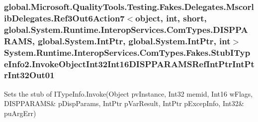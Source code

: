 \hypertarget{class_system_1_1_runtime_1_1_interop_services_1_1_com_types_1_1_fakes_1_1_stub_i_type_info2_af267cd272a63d5c0b874b6534d1c0d00}{
\subsubsection[{Invoke\-Object\-Int32\-Int16\-D\-I\-S\-P\-P\-A\-R\-A\-M\-S\-Ref\-Int\-Ptr\-Int\-Ptr\-Int32\-Out01}]{\setlength{\rightskip}{0pt plus 5cm}global.\-Microsoft.\-Quality\-Tools.\-Testing.\-Fakes.\-Delegates.\-Mscorlib\-Delegates.\-Ref3\-Out6\-Action7$<$object, int, short, global.\-System.\-Runtime.\-Interop\-Services.\-Com\-Types.\-D\-I\-S\-P\-P\-A\-R\-A\-M\-S, global.\-System.\-Int\-Ptr, global.\-System.\-Int\-Ptr, int$>$ System.\-Runtime.\-Interop\-Services.\-Com\-Types.\-Fakes.\-Stub\-I\-Type\-Info2.\-Invoke\-Object\-Int32\-Int16\-D\-I\-S\-P\-P\-A\-R\-A\-M\-S\-Ref\-Int\-Ptr\-Int\-Ptr\-Int32\-Out01}}\label{class_system_1_1_runtime_1_1_interop_services_1_1_com_types_1_1_fakes_1_1_stub_i_type_info2_af267cd272a63d5c0b874b6534d1c0d00}


Sets the stub of I\-Type\-Info.\-Invoke(Object pv\-Instance, Int32 memid, Int16 w\-Flags, D\-I\-S\-P\-P\-A\-R\-A\-M\-S\& p\-Disp\-Params, Int\-Ptr p\-Var\-Result, Int\-Ptr p\-Excep\-Info, Int32\& pu\-Arg\-Err)

